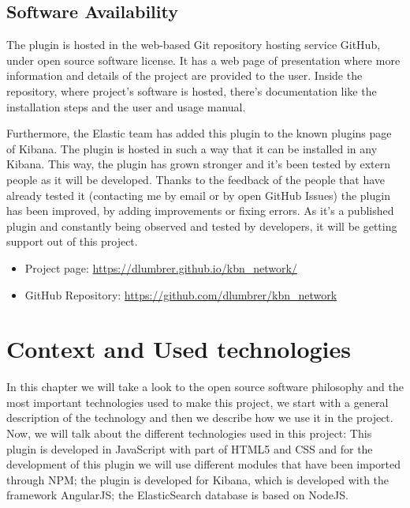 \documentclass[a4paper, 12pt]{book}
\begin{document}
\section{Software Availability}
\label{sec:softavail}

The plugin is hosted in the web-based Git repository hosting service GitHub, under open source software license. It has a web page of presentation where more information and details of the project are provided to the user. Inside the repository, where project's software is hosted, there's documentation like the installation steps and the user and usage manual.

Furthermore, the Elastic team has added this plugin to the known plugins page of Kibana. The plugin is hosted in such a way that it can be installed in any Kibana. This way, the plugin has grown stronger and it's been tested by extern people as it will be developed. Thanks to the feedback of the people that have already tested it (contacting me by email or by open GitHub Issues) the plugin has been improved, by adding improvements or fixing errors. As it’s a published plugin and constantly being observed and tested by developers, it will be getting support out of this project.

\begin{itemize}
\item Project page: \url{https://dlumbrer.github.io/kbn_network/}
\item GitHub Repository: \url{https://github.com/dlumbrer/kbn_network}
\end{itemize}



\chapter{Context and Used technologies}

In this chapter we will take a look to the open source software philosophy and the most important technologies used to make this project, we start with a general description of the technology and then we describe how we use it in the project. Now, we will talk about the different technologies used in this project: This plugin is developed in JavaScript with part of HTML5 and CSS and for the development of this plugin we will use different modules that have been imported through NPM; the plugin is developed for Kibana, which is developed with the framework AngularJS; the ElasticSearch database is based on NodeJS.
\end{document}
